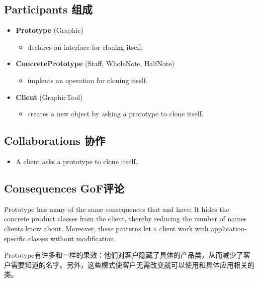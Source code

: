 
\subsection{Participants 组成}

\begin{itemize}
\small
\item \textbf{Prototype} (Graphic)

	\begin{itemize}
		\item declares an interface for cloning itself.
	\end{itemize}

\item \textbf{ConcretePrototype} (Staff, WholeNote, HalfNote)

	\begin{itemize}
		\item implents an operation for cloning itself.
	\end{itemize}

\item \textbf{Client} (GraphicTool)

	\begin{itemize}
		\item creates a new object by asking a prorotype to clone itself.
	\end{itemize}
\normalize
\end{itemize}

\subsection{Collaborations 协作}

\begin{itemize}
\item A client asks a prototype to clone itself.
\end{itemize}

\subsection{Consequences GoF评论}

Prototype has many of the same consequences that and  have: It hides the concrete product classes from the client, thereby reducing the number of names clients know about. Moreover, these patterns let a client work with application-specific classes without modification.

Prototype有许多和一样的果效：他们对客户隐藏了具体的产品类，从而减少了客户需要知道的名字。另外，这些模式使客户无需改变就可以使用和具体应用相关的类。

